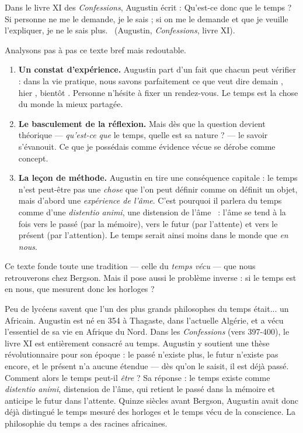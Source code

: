 \documentclass[11pt]{article}
\begin{document}
\begin{experience}
Dans le livre XI des \emph{Confessions}, Augustin écrit : \guillemotleft Qu'est-ce donc que le temps ? Si personne ne me le demande, je le sais ; si on me le demande et que je veuille l'expliquer, je ne le sais plus. \guillemotright\ (Augustin, \emph{Confessions}, livre XI).

Analysons pas à pas ce texte bref mais redoutable.
\begin{enumerate}
\item \textbf{Un constat d'expérience.} Augustin part d'un fait que chacun peut vérifier : dans la vie pratique, nous savons parfaitement ce que veut dire \guillemotleft demain \guillemotright, \guillemotleft hier \guillemotright, \guillemotleft bientôt \guillemotright. Personne n'hésite à fixer un rendez-vous. Le temps est la chose du monde la mieux partagée.
\item \textbf{Le basculement de la réflexion.} Mais dès que la question devient théorique — \emph{qu'est-ce que} le temps, quelle est sa nature ? — le savoir s'évanouit. Ce que je possédais comme évidence vécue se dérobe comme concept.
\item \textbf{La leçon de méthode.} Augustin en tire une conséquence capitale : le temps n'est peut-être pas une \emph{chose} que l'on peut définir comme on définit un objet, mais d'abord une \emph{expérience de l'âme}. C'est pourquoi il parlera du temps comme d'une \emph{distentio animi}, une \guillemotleft distension de l'âme \guillemotright\ : l'âme se tend à la fois vers le passé (par la mémoire), vers le futur (par l'attente) et vers le présent (par l'attention). Le temps serait ainsi moins dans le monde que \emph{en nous}.
\end{enumerate}
Ce texte fonde toute une tradition — celle du \emph{temps vécu} — que nous retrouverons chez Bergson. Mais il pose aussi le problème inverse : si le temps est en nous, que mesurent donc les horloges ?
\end{experience}

\begin{savaistu}
Peu de lycéens savent que l'un des plus grands philosophes du temps était... un Africain. Augustin est né en 354 à Thagaste, dans l'actuelle Algérie, et a vécu l'essentiel de sa vie en Afrique du Nord. Dans les \emph{Confessions} (vers 397-400), le livre XI est entièrement consacré au temps. Augustin y soutient une thèse révolutionnaire pour son époque : le passé n'existe plus, le futur n'existe pas encore, et le présent n'a aucune étendue — dès qu'on le saisit, il est déjà passé. Comment alors le temps peut-il \emph{être} ? Sa réponse : le temps existe comme \emph{distentio animi}, distension de l'âme, qui retient le passé dans la mémoire et anticipe le futur dans l'attente. Quinze siècles avant Bergson, Augustin avait donc déjà distingué le temps mesuré des horloges et le temps vécu de la conscience. La philosophie du temps a des racines africaines.
\end{savaistu}
\end{document}
